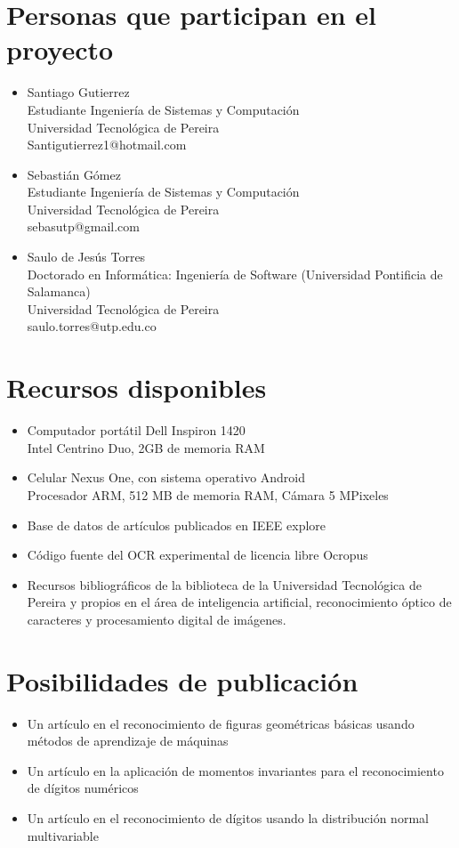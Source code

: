 \documentclass[a4paper, 11pt, oneside]{article}
\begin{document}
	\section{Personas que participan en el proyecto}
	\begin{itemize}
   \item Santiago Gutierrez\\
Estudiante Ingeniería de Sistemas y Computación\\
Universidad Tecnológica de Pereira\\
Santigutierrez1@hotmail.com
   \item Sebastián Gómez\\
Estudiante Ingeniería de Sistemas y Computación\\
Universidad Tecnológica de Pereira\\
sebasutp@gmail.com
   \item Saulo de Jesús Torres\\
Doctorado en Informática: Ingeniería de Software (Universidad Pontificia de Salamanca)\\
Universidad Tecnológica de Pereira\\
saulo.torres@utp.edu.co
	\end{itemize}
	\clearpage
	
	\section{Recursos disponibles}
	\begin{itemize}
		\item Computador portátil Dell Inspiron 1420\\
			Intel Centrino Duo, 2GB de memoria RAM
		\item Celular Nexus One, con sistema operativo Android\\
			Procesador ARM, 512 MB de memoria RAM, Cámara 5 MPixeles
		\item Base de datos de artículos publicados en IEEE explore
		\item Código fuente del OCR experimental de licencia libre Ocropus
	    \item Recursos bibliográficos de la biblioteca de la Universidad Tecnológica de Pereira y propios en el área de inteligencia artificial, reconocimiento óptico de caracteres y procesamiento digital de imágenes.
	\end{itemize}
	
	\section{Posibilidades de publicación}
	\begin{itemize}
		\item Un artículo en el reconocimiento de figuras geométricas básicas usando métodos de aprendizaje de máquinas
		\item Un artículo en la aplicación de momentos invariantes para el reconocimiento de dígitos numéricos
		\item Un artículo en el reconocimiento de dígitos usando la distribución normal multivariable
	\end{itemize}
	
\end{document}
